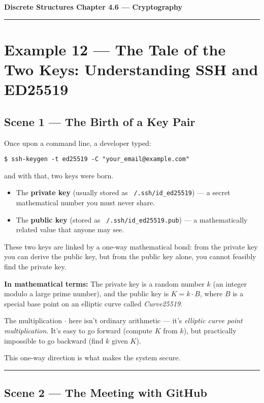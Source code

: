 \documentclass[12pt]{article}
\begin{document}
{\large \textbf{Discrete Structures \quad Chapter 4.6 — Cryptography}}

\hrule
\vspace{0.6em}

\section*{Example 12 — The Tale of the Two Keys: Understanding SSH and ED25519}

\subsection*{Scene 1 — The Birth of a Key Pair}

Once upon a command line, a developer typed:

\begin{verbatim}
$ ssh-keygen -t ed25519 -C "your_email@example.com"
\end{verbatim}

and with that, two keys were born.

\begin{itemize}
  \item The \textbf{private key} (usually stored as \texttt{~/.ssh/id\_ed25519}) — a secret mathematical number you must never share.
  \item The \textbf{public key} (stored as \texttt{~/.ssh/id\_ed25519.pub}) — a mathematically related value that anyone may see.
\end{itemize}

These two keys are linked by a one-way mathematical bond:  
from the private key you can derive the public key,  
but from the public key alone, you cannot feasibly find the private key.

\textbf{In mathematical terms:}  
The private key is a random number $k$ (an integer modulo a large prime number),  
and the public key is $K = k \cdot B$,  
where $B$ is a special base point on an elliptic curve called \emph{Curve25519}.

The multiplication $\cdot$ here isn’t ordinary arithmetic — it’s \emph{elliptic curve point multiplication}.  
It’s easy to go forward (compute $K$ from $k$),  
but practically impossible to go backward (find $k$ given $K$).

This one-way direction is what makes the system secure.

\bigskip
\hrule
\vspace{0.5em}

\subsection*{Scene 2 — The Meeting with GitHub}
\end{document}
